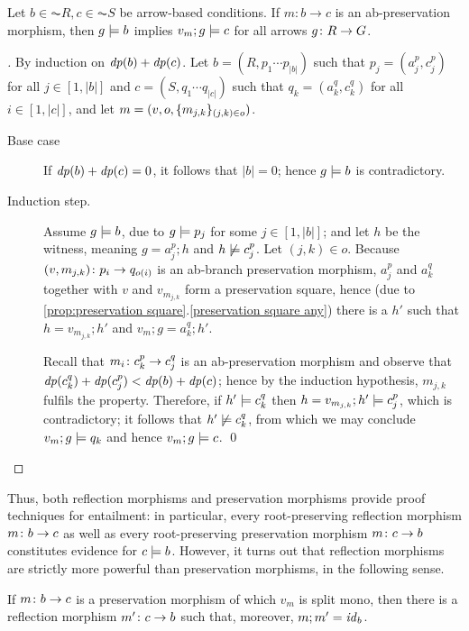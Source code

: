 \begin{proposition}
  \label{prop:ab-preservation morphisms preserve}
Let $b\in \AC R,c \in \AC{S}$ be arrow-based conditions. If $m:b\to c$ is an ab-preservation morphism, then $g\models b$ implies $v_m;g \models c$ for all arrows $g\colon R\rightarrow G$. 
\end{proposition}

\begin{proof}[]
By induction on $\mathit{dp}(b)+\mathit{dp}(c)$. Let $b=(R,p_1\cdots p_{|b|})$ such that $p_j=(a^p_j,c^p_j)$ for all $j\in[1,|b|]$ and $c=(S,q_1\cdots q_{|c|})$ such that $q_k=(a^q_k,c^q_k)$ for all $i\in[1,|c|]$, and let $m=(v,o,\{{m_{j,k}}\}_{(j,k)\in o})$.
\begin{description}
\item[Base case] If $\mathit{dp}(b)+\mathit{dp}(c)=0$, it follows that $|b|=0$; hence $g\models b$ is contradictory.
\item[Induction step.] Assume $g\models b$, due to $g\models p_j$ for some $j\in [1,|b|]$; and let $h$ be the witness, meaning $g=a^p_j;h$ and $h\not\models c^p_j$. Let $(j,k)\in o$. Because $(v,m_{j,k})\colon p_{i}\rightarrow q_{o(i)}$ is an ab-branch preservation morphism, $a^p_j$ and $a^q_k$ together with $v$ and $v_{m_{j,k}}$ form a preservation square, hence (due to \cref{prop:preservation square}.\ref{preservation square any}) there is a $h'$ such that $h=v_{m_{j,k}};h'$ and $v_m;g=a^q_k;h'$.

\smallskip
Recall that $m_i\colon c^p_k\rightarrow c^q_j$ is an ab-preservation morphism and observe that $\mathit{dp}(c^q_k)+\mathit{dp}(c^p_j) < \mathit{dp}(b)+\mathit{dp}(c)$; hence by the induction hypothesis, $m_{j,k}$ fulfils the property. Therefore, if $h'\models c^q_k$ then $h=v_{m_{j,k}};h'\models c^p_j$, which is contradictory; it follows that $h'\not\models c^q_k$, from which we may conclude $v_m;g\models q_k$ and hence $v_m;g\models c$. \qed
\end{description}
\end{proof}
%
Thus, both reflection morphisms and preservation morphisms provide proof techniques for entailment: in particular, every root-preserving reflection morphism $m\colon b\rightarrow c$ as well as  every root-preserving preservation morphism $m\colon c\rightarrow b$ constitutes evidence for $c\models b$. However, it turns out that reflection morphisms are strictly more powerful than preservation morphisms, in the following sense.
%
\begin{proposition}\label{prop:reflection beats preservation}
If $m\colon b\rightarrow c$ is a preservation morphism of which $v_m$ is split mono, then there is a reflection morphism $m'\colon c\rightarrow b$ such that, moreover, $m;m'=\mathit{id}_b$.
\end{proposition}
